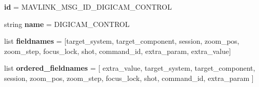 \begin{DoxyCompactItemize}
\item 
\mbox{\label{classpymavlink_1_1dialects_1_1v10_1_1MAVLink__digicam__control__message_a9afdc8503eab36283cd5acaafb51dbc3}} 
{\bfseries id} = M\+A\+V\+L\+I\+N\+K\+\_\+\+M\+S\+G\+\_\+\+I\+D\+\_\+\+D\+I\+G\+I\+C\+A\+M\+\_\+\+C\+O\+N\+T\+R\+OL
\item 
\mbox{\label{classpymavlink_1_1dialects_1_1v10_1_1MAVLink__digicam__control__message_ab198e7f8819cc41c3f2cbb9d6b22773f}} 
string {\bfseries name} = \textquotesingle{}D\+I\+G\+I\+C\+A\+M\+\_\+\+C\+O\+N\+T\+R\+OL\textquotesingle{}
\item 
\mbox{\label{classpymavlink_1_1dialects_1_1v10_1_1MAVLink__digicam__control__message_a55e51f86916f6f4adfa68cf3d886958a}} 
list {\bfseries fieldnames} = \mbox{[}\textquotesingle{}target\+\_\+system\textquotesingle{}, \textquotesingle{}target\+\_\+component\textquotesingle{}, \textquotesingle{}session\textquotesingle{}, \textquotesingle{}zoom\+\_\+pos\textquotesingle{}, \textquotesingle{}zoom\+\_\+step\textquotesingle{}, \textquotesingle{}focus\+\_\+lock\textquotesingle{}, \textquotesingle{}shot\textquotesingle{}, \textquotesingle{}command\+\_\+id\textquotesingle{}, \textquotesingle{}extra\+\_\+param\textquotesingle{}, \textquotesingle{}extra\+\_\+value\textquotesingle{}\mbox{]}
\item 
\mbox{\label{classpymavlink_1_1dialects_1_1v10_1_1MAVLink__digicam__control__message_a810ae6a904160c6b2fef96f5858f89ee}} 
list {\bfseries ordered\+\_\+fieldnames} = \mbox{[} \textquotesingle{}extra\+\_\+value\textquotesingle{}, \textquotesingle{}target\+\_\+system\textquotesingle{}, \textquotesingle{}target\+\_\+component\textquotesingle{}, \textquotesingle{}session\textquotesingle{}, \textquotesingle{}zoom\+\_\+pos\textquotesingle{}, \textquotesingle{}zoom\+\_\+step\textquotesingle{}, \textquotesingle{}focus\+\_\+lock\textquotesingle{}, \textquotesingle{}shot\textquotesingle{}, \textquotesingle{}command\+\_\+id\textquotesingle{}, \textquotesingle{}extra\+\_\+param\textquotesingle{} \mbox{]}
\item 

\end{DoxyCompactItemize}
